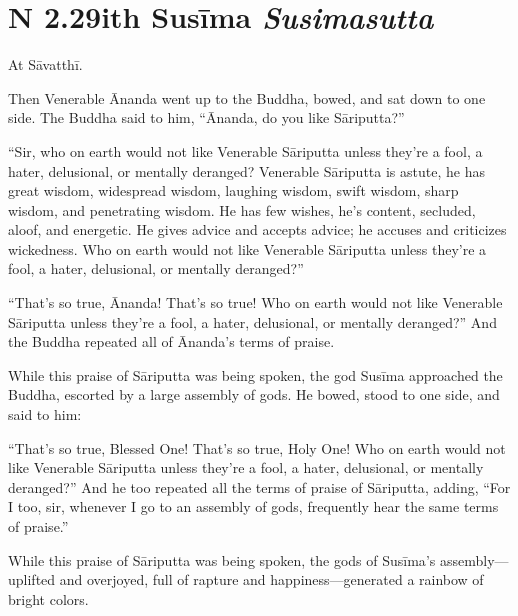 \documentclass[12pt,openany]{book}%
\newcommand*{\suttatitleacronym}[1]{\smaller[2]{#1}\vspace*{.3em}}
\newcommand*{\suttatitletranslation}[1]{\linebreak{#1}}
\newcommand*{\suttatitleroot}[1]{\linebreak\smaller[2]\itshape{#1}}
\newcommand*{\tocacronym}[1]{\hspace*{-3.3em}{#1}\quad}
\newcommand*{\toctranslation}[1]{#1}
\newcommand*{\tocroot}[1]{(\textit{#1})}
\begin{document}
%
\section*{{\suttatitleacronym SN 2.29}{\suttatitletranslation With Susīma }{\suttatitleroot Susimasutta}}
\addcontentsline{toc}{section}{\tocacronym{SN 2.29} \toctranslation{With Susīma } \tocroot{Susimasutta}}

At \textsanskrit{Sāvatthī}. 

Then Venerable Ānanda went up to the Buddha, bowed, and sat down to one side. The Buddha said to him, “Ānanda, do you like \textsanskrit{Sāriputta}?” 

“Sir, who on earth would not like Venerable \textsanskrit{Sāriputta} unless they’re a fool, a hater, delusional, or mentally deranged? Venerable \textsanskrit{Sāriputta} is astute, he has great wisdom, widespread wisdom, laughing wisdom, swift wisdom, sharp wisdom, and penetrating wisdom. He has few wishes, he’s content, secluded, aloof, and energetic. He gives advice and accepts advice; he accuses and criticizes wickedness. Who on earth would not like Venerable \textsanskrit{Sāriputta} unless they’re a fool, a hater, delusional, or mentally deranged?” 

“That’s so true, Ānanda! That’s so true! Who on earth would not like Venerable \textsanskrit{Sāriputta} unless they’re a fool, a hater, delusional, or mentally deranged?” And the Buddha repeated all of Ānanda’s terms of praise. 

While this praise of \textsanskrit{Sāriputta} was being spoken, the god \textsanskrit{Susīma} approached the Buddha, escorted by a large assembly of gods. He bowed, stood to one side, and said to him: 

“That’s so true, Blessed One! That’s so true, Holy One! Who on earth would not like Venerable \textsanskrit{Sāriputta} unless they’re a fool, a hater, delusional, or mentally deranged?” And he too repeated all the terms of praise of \textsanskrit{Sāriputta}, adding, “For I too, sir, whenever I go to an assembly of gods, frequently hear the same terms of praise.” 

While this praise of \textsanskrit{Sāriputta} was being spoken, the gods of \textsanskrit{Susīma}’s assembly—uplifted and overjoyed, full of rapture and happiness—generated a rainbow of bright colors. 
\end{document}
